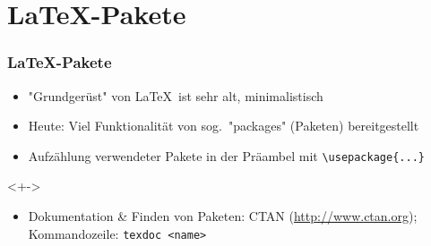 \section{\LaTeX-Pakete}

\begin{frame}[<+->][fragile]
	\frametitle{\LaTeX-Pakete}
	
	\lstset{frame=L, numbers=left, xleftmargin=0.5cm}
	\begin{itemize}
		\item "Grundgerüst" von \LaTeX\ ist sehr alt, minimalistisch
		\item Heute: Viel Funktionalität von sog.\ "packages" (Paketen) bereitgestellt
		\item Aufzählung verwendeter Pakete in der Präambel mit \lstinline!\usepackage{...}!		
	\end{itemize}
	
	
	\begin{visibleenv}<+->
	\hspace{0.5cm}
	\end{visibleenv}
	
	\begin{itemize}
		\item Dokumentation \& Finden von Paketen: CTAN (\url{http://www.ctan.org}); Kommandozeile: \texttt{texdoc <name>}
	\end{itemize}
\end{frame}

